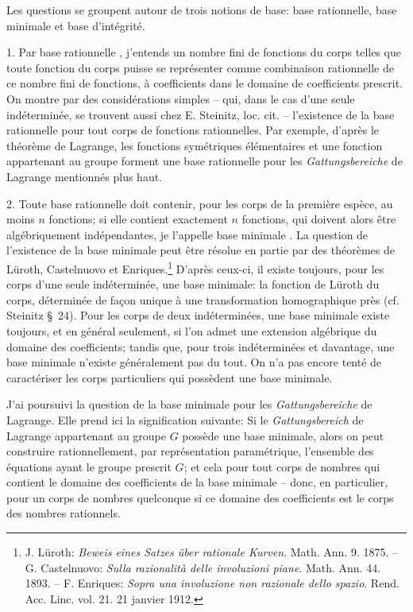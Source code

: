 \documentclass[11pt]{article}
\begin{document}
Les questions se groupent autour de trois notions de base: base rationnelle, base minimale et base d'intégrité.

1. Par \og base rationnelle \fg{}, j'entends un nombre fini de fonctions du corps telles que toute fonction du corps puisse se représenter comme combinaison rationnelle de ce nombre fini de fonctions, à coefficients dans le domaine de coefficients prescrit. On montre par des considérations simples -- qui, dans le cas d'une seule indéterminée, se trouvent aussi chez E. Steinitz, loc. cit. -- l'existence de la base rationnelle pour tout corps de fonctions rationnelles. Par exemple, d'après le théorème de Lagrange, les fonctions symétriques élémentaires et une fonction appartenant au groupe forment une base rationnelle pour les \emph{Gattungsbereiche} de Lagrange mentionnés plus haut.

2. Toute base rationnelle doit contenir, pour les corps de la première espèce, au moins $n$ fonctions; si elle contient exactement $n$ fonctions, qui doivent alors être algébriquement indépendantes, je l'appelle \og base minimale \fg{}. La question de l'existence de la base minimale peut être résolue en partie par des théorèmes de Lüroth, Castelnuovo et Enriques.\footnote{J. Lüroth: \emph{Beweis eines Satzes über rationale Kurven}. Math. Ann. 9. 1875. -- G. Castelnuovo: \emph{Sulla razionalità delle involuzioni piane}. Math. Ann. 44. 1893. -- F. Enriques: \emph{Sopra una involuzione non razionale dello spazio}. Rend. Acc. Linc. vol. 21. 21 janvier 1912.} D'après ceux-ci, il existe toujours, pour les corps d'une seule indéterminée, une base minimale: la fonction de Lüroth du corps, déterminée de façon unique à une transformation homographique près (cf. Steinitz \S\ 24). Pour les corps de deux indéterminées, une base minimale existe toujours, et en général seulement, si l'on admet une extension algébrique du domaine des coefficients; tandis que, pour trois indéterminées et davantage, une base minimale n'existe généralement pas du tout. On n'a pas encore tenté de caractériser les corps particuliers qui possèdent une base minimale.

J'ai poursuivi la question de la base minimale pour les \emph{Gattungsbereiche} de Lagrange. Elle prend ici la signification suivante: \og Si le \emph{Gattungsbereich} de Lagrange appartenant au groupe $G$ possède une base minimale, alors on peut construire rationnellement, par représentation paramétrique, l'ensemble des équations ayant le groupe prescrit $G$; et cela pour tout corps de nombres qui contient le domaine des coefficients de la base minimale -- donc, en particulier, pour un corps de nombres quelconque si ce domaine des coefficients est le corps des nombres rationnels. \fg{}
\end{document}
